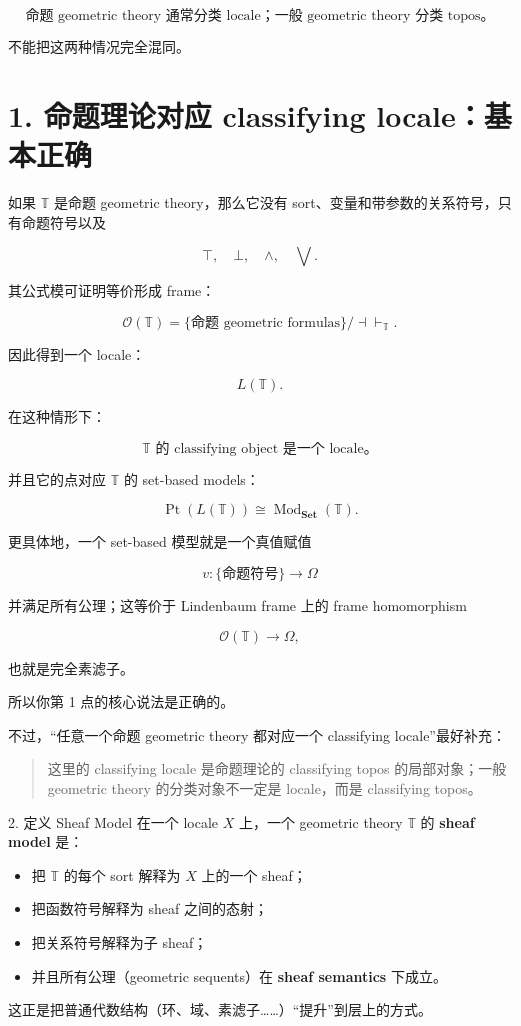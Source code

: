\documentclass{beamer}
\begin{document}
\begin{frame}[shrink]
\[
\boxed{
\text{命题 geometric theory 通常分类 locale；一般 geometric theory 分类 topos。}
}
\]

不能把这两种情况完全混同。

\section*{1. 命题理论对应 classifying locale：基本正确}

如果 $\mathbb T$ 是命题 geometric theory，那么它没有 sort、变量和带参数的关系符号，只有命题符号以及

\[
\top,\quad\bot,\quad\wedge,\quad\bigvee.
\]

其公式模可证明等价形成 frame：

\[
\mathcal O(\mathbb T)
=
\{\text{命题 geometric formulas}\}/\mathord{\dashv\vdash_{\mathbb T}}.
\]

因此得到一个 locale：

\[
L(\mathbb T).
\]

在这种情形下：

\[
\boxed{
\text{$\mathbb T$ 的 classifying object 是一个 locale。}
}
\]

并且它的点对应 $\mathbb T$ 的 set-based models：

\[
\operatorname{Pt}(L(\mathbb T))
\cong
\operatorname{Mod}_{\mathbf{Set}}(\mathbb T).
\]

更具体地，一个 set-based 模型就是一个真值赋值

\[
v:\{\text{命题符号}\}\to\Omega
\]

并满足所有公理；这等价于 Lindenbaum frame 上的 frame homomorphism

\[
\mathcal O(\mathbb T)\to\Omega,
\]

也就是完全素滤子。

所以你第 1 点的核心说法是正确的。

不过，``任意一个命题 geometric theory 都对应一个 classifying locale''最好补充：

\begin{quote}
这里的 classifying locale 是命题理论的 classifying topos 的局部对象；一般 geometric theory 的分类对象不一定是 locale，而是 classifying topos。
\end{quote}
\end{frame}

\begin{frame}{2. 定义 Sheaf Model}
在一个 locale $X$ 上，一个 geometric theory $\mathbb{T}$ 的 \textbf{sheaf model} 是：
\begin{itemize}
    \item 把 $\mathbb{T}$ 的每个 sort 解释为 $X$ 上的一个 sheaf；
    \item 把函数符号解释为 sheaf 之间的态射；
    \item 把关系符号解释为子 sheaf；
    \item 并且所有公理（geometric sequents）在 \textbf{sheaf semantics} 下成立。
\end{itemize}

这正是把普通代数结构（环、域、素滤子……）``提升''到层上的方式。
\end{frame}
\end{document}

